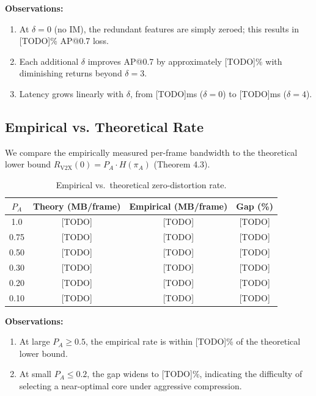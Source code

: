 \textbf{Observations:}
\begin{enumerate}
    \item At $\delta = 0$ (no IM), the redundant features are simply zeroed;
          this results in [TODO]\% AP@0.7 loss.
    \item Each additional $\delta$ improves AP@0.7 by approximately
          [TODO]\% with diminishing returns beyond $\delta = 3$.
    \item Latency grows linearly with $\delta$, from [TODO]ms ($\delta = 0$)
          to [TODO]ms ($\delta = 4$).
\end{enumerate}

\subsection{Empirical vs. Theoretical Rate}
\label{sec:exp-theory}

We compare the empirically measured per-frame bandwidth to the theoretical
lower bound $R_{\mathrm{V2X}}(0) = P_A \cdot H(\pi_A)$ (Theorem 4.3).

\begin{table}[htbp]
\centering
\caption{Empirical vs.\ theoretical zero-distortion rate.}
\label{tab:theory}
\begin{tabular}{|c|c|c|c|}
\hline
$P_A$ & \textbf{Theory (MB/frame)} & \textbf{Empirical (MB/frame)} & \textbf{Gap (\%)} \\
\hline
1.0 & [TODO] & [TODO] & [TODO] \\
0.75 & [TODO] & [TODO] & [TODO] \\
0.50 & [TODO] & [TODO] & [TODO] \\
0.30 & [TODO] & [TODO] & [TODO] \\
0.20 & [TODO] & [TODO] & [TODO] \\
0.10 & [TODO] & [TODO] & [TODO] \\
\hline
\end{tabular}
\end{table}

\textbf{Observations:}
\begin{enumerate}
    \item At large $P_A \geq 0.5$, the empirical rate is within [TODO]\% of
          the theoretical lower bound.
    \item At small $P_A \leq 0.2$, the gap widens to [TODO]\%, indicating
          the difficulty of selecting a near-optimal core under aggressive
          compression.
\end{enumerate}

